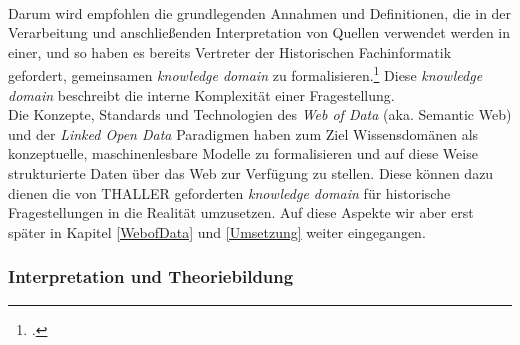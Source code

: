 \documentclass[12pt,a4paper]{article}
\begin{document}
\\
Darum wird empfohlen die grundlegenden Annahmen und Definitionen, die in der Verarbeitung und anschließenden Interpretation von Quellen verwendet werden in einer, und so haben es bereits Vertreter der Historischen Fachinformatik gefordert, gemeinsamen \textit{knowledge domain} zu formalisieren.\footcite[][S.263]{thaller2017historical} Diese \textit{knowledge domain} beschreibt die interne Komplexität einer Fragestellung.
\\
Die Konzepte, Standards und Technologien des \textit{Web of Data} (aka. Semantic Web) und der \textit{Linked Open Data} Paradigmen haben zum Ziel Wissensdomänen als konzeptuelle, maschinenlesbare Modelle zu formalisieren und auf diese Weise strukturierte Daten über das Web zur Verfügung zu stellen. Diese können dazu dienen die von THALLER geforderten \textit{knowledge domain} für historische Fragestellungen in die Realität umzusetzen. Auf diese Aspekte wir aber erst später in Kapitel \ref{WebofData} und \ref{Umsetzung} weiter eingegangen.

\subsubsection{Interpretation und Theoriebildung}
\end{document}
